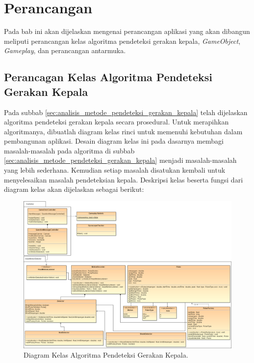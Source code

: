 \chapter{Perancangan}
\label{chap:perancangan}


Pada bab ini akan dijelaskan mengenai perancangan aplikasi yang akan dibangun meliputi perancangan kelas algoritma pendeteksi gerakan kepala, \textit{GameObject},  \textit{Gameplay}, dan perancangan antarmuka.

\section{Perancagan Kelas Algoritma Pendeteksi Gerakan Kepala}
\label{sec:perancangan_kelas_algoritma_Pendeteksi_Gerakan_Kepala}

Pada subbab \ref{sec:analisis_metode_pendeteksi_gerakan_kepala} telah dijelaskan algoritma pendeteksi gerakan kepala secara prosedural. Untuk merapihkan algoritmanya, dibuatlah diagram kelas rinci untuk memenuhi kebutuhan dalam pembangunan aplikasi. Desain diagram kelas ini pada dasarnya membagi  masalah-masalah pada algoritma di subbab \ref{sec:analisis_metode_pendeteksi_gerakan_kepala} menjadi masalah-masalah yang lebih sederhana. Kemudian setiap masalah disatukan kembali untuk menyelesaikan masalah pendeteksian kepala. Deskripsi kelas beserta fungsi dari diagram kelas akan dijelaskan sebagai berikut:

\begin{figure}[htbp]
\centering
\includegraphics[scale=0.3]{Gambar/diagram-kelas-algoritma-pendeteksi-gerakan-kepala.png}
\caption{Diagram Kelas Algoritma Pendeteksi Gerakan Kepala.}
\label{fig:diagram-kelas-algoritma-pendeteksi-gerakan-kepala}
\end{figure}

